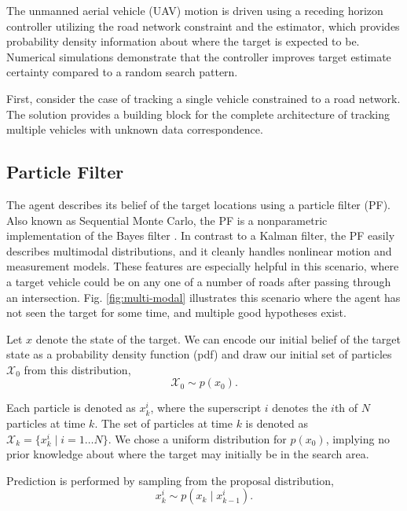 \documentclass[letterpaper, 10 pt, conference]{ieeeconf}  %
\begin{document}
The unmanned aerial vehicle (UAV) motion is driven using a receding horizon controller utilizing the road network constraint and the estimator, which provides probability density information about where the target is expected to be. Numerical simulations demonstrate that the controller improves target estimate certainty compared to a random search pattern.

First, consider the case of tracking a single vehicle constrained to a road network. The solution provides a building block for the complete architecture of tracking multiple vehicles with unknown data correspondence.

\subsection{Particle Filter}

The agent describes its belief of the target locations using a particle filter (PF). Also known as Sequential Monte Carlo, the PF is a nonparametric implementation of the Bayes filter \cite{Arulampalam2002}. In contrast to a Kalman filter, the PF easily describes multimodal distributions, and it cleanly handles nonlinear motion and measurement models. These features are especially helpful in this scenario, where a target vehicle could be on any one of a number of roads after passing through an intersection. Fig. \ref{fig:multi-modal} illustrates this scenario where the agent has not seen the target for some time, and multiple good hypotheses exist.

Let $x$ denote the state of the target. We can encode our initial belief of the target state as a probability density function (pdf) and draw our initial set of particles $\mathcal{X}_0$ from this distribution,
\begin{equation}%
    \mathcal{X}_0 \sim p(x_0).
\end{equation}

Each particle is denoted as $x^i_k$, where the superscript $i$ denotes the $i$th of $N$ particles at time $k$. The set of particles at time $k$ is denoted as $\mathcal{X}_k = \{x^i_k \mid i = 1 \ldots N\}$. We chose a uniform distribution for $p(x_0)$, implying no prior knowledge about where the target may initially be in the search area.

Prediction is performed by sampling from the proposal distribution,
\begin{equation}\label{eq:proposal_dist}
    x^i_k \sim p(x_k \mid x^i_{k-1}).
\end{equation}
\end{document}
